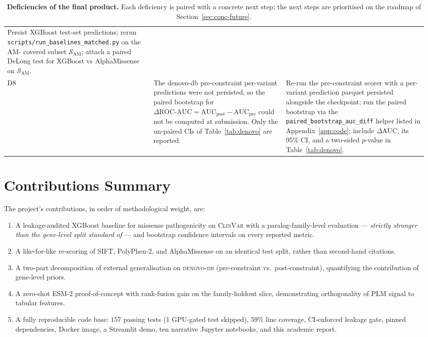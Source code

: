 \documentclass[11pt,a4paper,oneside]{report}
\begin{document}
\begin{table}[htbp]
\begin{tabularx}{\linewidth}{@{}l X X@{}}
Persist XGBoost test-set predictions; rerun
\texttt{scripts/run\_baselines\_matched.py} on the AM-
covered subset $\mathcal{S}_{\text{AM}}$; attach a paired
DeLong test for XGBoost vs AlphaMissense on
$\mathcal{S}_{\text{AM}}$. \\
D8 & The denovo-db pre-constraint per-variant predictions
were not persisted, so the paired bootstrap for
$\Delta\text{ROC-AUC} = \text{AUC}_{\text{post}} -
\text{AUC}_{\text{pre}}$ could not be computed at
submission. Only the un-paired CIs of Table~\ref{tab:denovo}
are reported. &
Re-run the pre-constraint scorer with a per-variant
prediction parquet persisted alongside the checkpoint;
run the paired bootstrap via the
\texttt{paired\_bootstrap\_auc\_diff} helper listed in
Appendix~\ref{app:code}; include $\Delta\text{AUC}$,
its 95\% CI, and a two-sided $p$-value in
Table~\ref{tab:denovo}. \\
\bottomrule
\end{tabularx}
\caption[Deficiencies]{\textbf{Deficiencies of the final
product.} Each deficiency is paired with a concrete next
step; the next steps are prioritised on the roadmap of
Section~\ref{sec:conc-future}.}
\label{tab:deficiencies}
\end{table}

\section{Contributions Summary}
\label{sec:conc-contrib}

The project's contributions, in order of methodological
weight, are:

\begin{enumerate}[leftmargin=1.8em, itemsep=0.2em]
\item A leakage-audited XGBoost baseline for missense
  pathogenicity on \textsc{ClinVar} with a
  paralog-family-level evaluation --- \emph{strictly
  stronger than the gene-level split standard of}
  \citet{heijl2020gap} --- and bootstrap confidence
  intervals on every reported metric.
\item A like-for-like re-scoring of SIFT, PolyPhen-2, and
  AlphaMissense on an identical test split, rather than
  second-hand citations.
\item A two-part decomposition of external
  generalisation on \textsc{denovo-db} (pre-constraint vs.\
  post-constraint), quantifying the contribution of
  gene-level priors.
\item A zero-shot ESM-2 proof-of-concept with rank-fusion
  gain on the family-holdout slice, demonstrating
  orthogonality of PLM signal to tabular features.
\item A fully reproducible code base: $157$ passing
  tests (1 GPU-gated test skipped), $59\%$ line coverage,
  CI-enforced leakage gate, pinned dependencies, Docker
  image, a Streamlit demo, ten narrative Jupyter notebooks,
  and this academic report.
\end{enumerate}
\end{document}
